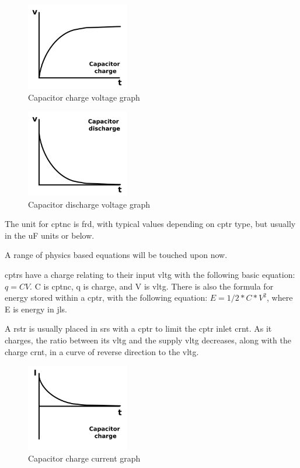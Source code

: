 \documentclass[a4paper,11pt]{report}
\begin{document}
\begin{figure}[H]
\centering
\includegraphics[width=0.4\textwidth]{capacitorcharge}
\caption{Capacitor charge voltage graph}
\end{figure}

\begin{figure}[H]
\centering
\includegraphics[width=0.4\textwidth]{capacitordischarge}
\caption{Capacitor discharge voltage graph}
\end{figure}

The unit for \gls{cptnc} is \gls{frd}, with typical values depending on \gls{cptr} type, but usually in the uF units or below.

A range of physics based equations will be touched upon now.

\gls{cptr}s have a charge relating to their input \gls{vltg} with the following basic equation: $q = CV$.  C is \gls{cptnc}, q is charge, and V is \gls{vltg}. There is also the formula for energy stored within a \gls{cptr}, with the following equation: $E = 1/2*C*V^2$, where E is energy in \gls{jls}.

A \gls{rstr} is usually placed in \gls{srs} with a \gls{cptr} to limit the \gls{cptr} inlet \gls{crnt}. As it charges, the ratio between its \gls{vltg} and the supply \gls{vltg} decreases, along with the charge \gls{crnt}, in a curve of reverse direction to the \gls{vltg}.

\begin{figure}[H]
\centering
\includegraphics[width=0.4\textwidth]{capacitorchargecurrent}
\caption{Capacitor charge current graph}
\end{figure}
\end{document}
